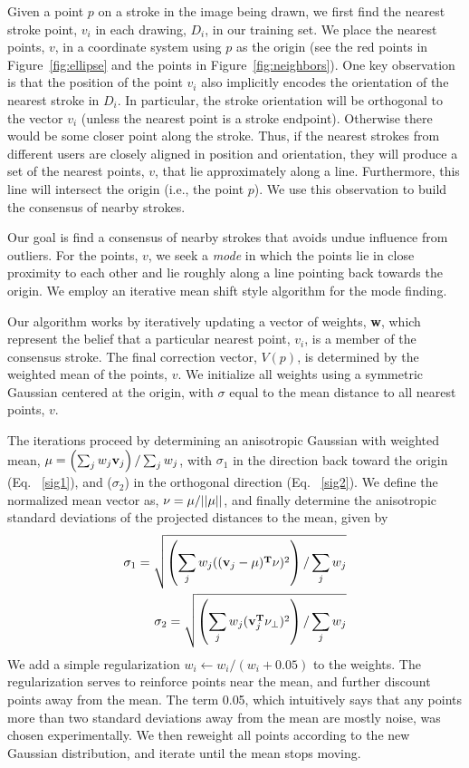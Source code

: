 Given a point $p$ on a stroke in the image being drawn, we first find the nearest stroke point, $v_i$ in each drawing, $D_i$, in our training set. We place the nearest points, $v$, in a coordinate system using $p$ as the origin (see the red points in Figure~\ref{fig:ellipse} and the points in Figure~\ref{fig:neighbors}). One key observation is that the position of the point $v_i$ also implicitly encodes the orientation of the nearest stroke in $D_i$. In particular, the stroke orientation will be orthogonal to the vector $v_i$ (unless the nearest point is a stroke endpoint). Otherwise there would be some closer point along the stroke. Thus, if the nearest strokes from different users are closely aligned in position and orientation, they will produce a set of the nearest points, $v$, that lie approximately along a line. Furthermore, this line will intersect the origin (i.e., the point $p$). We use this observation to build the consensus of nearby strokes.

Our goal is find a consensus of nearby strokes that avoids undue influence from outliers. For the points, $v$, we seek a {\em mode} in which the points lie in close proximity to each other and lie roughly along a line pointing back towards the origin. We employ an iterative mean shift style algorithm for the mode finding.

Our algorithm works by iteratively updating a vector of weights, {\bf w}, which represent the belief that a particular nearest point, $v_i$, is a member of the consensus stroke. The final correction vector, $V(p)$, is determined by the weighted mean of the points, $v$. We initialize all weights using a symmetric Gaussian centered at the origin, with $\sigma$ equal to the mean distance to all nearest points, $v$.

The iterations proceed by determining an anisotropic Gaussian with weighted mean, ${\bf \mu} = \left(\sum_j w_j {\bf v}_j\right) / \sum_j w_j$, with
$\sigma_1$ in the direction back toward the origin (Eq. ~\ref{sig1}), and ($\sigma_2$) in the orthogonal direction (Eq. ~\ref{sig2}). 
We define the normalized mean vector as, ${\bf \nu} = \mu/||\mu|| $,
and finally determine the anisotropic standard deviations of the projected distances to the mean, given by
\begin{eqnarray}
\sigma_1 =  \sqrt{\left(\sum_j w_j (({\bf v}_j-\mu)^{\bf T}\nu)^2\right) / \sum_j w_j} \label{sig1}\\
\sigma_2 =  \sqrt{\left(\sum_j w_j ({\bf v}_j^{\bf T}\nu_\perp)^2\right) / \sum_j w_j} \label{sig2}
\end{eqnarray}
We add a simple regularization $w_i \leftarrow w_i/ (w_i+0.05)$ to the weights.  The regularization serves to reinforce points near the mean, and further discount points away from the mean. The term 0.05, which intuitively says that any points more than two standard deviations away from the mean are mostly noise, was chosen experimentally. We then reweight all points according to the new Gaussian distribution, and iterate until the mean stops moving.

